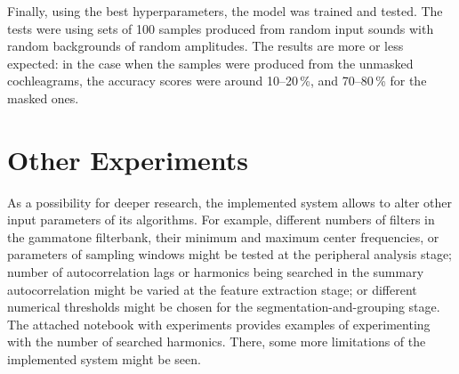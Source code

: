 Finally, using the best hyperparameters, the model was trained and tested. The tests were using sets of 100 samples produced from random input sounds with random backgrounds of random amplitudes. The results are more or less expected: in the case when the samples were produced from the unmasked cochleagrams, the accuracy scores were around 10--20\,\%, and 70--80\,\% for the masked ones.

\section{Other Experiments}

As a possibility for deeper research, the implemented system allows to alter other input parameters of its algorithms. For example, different numbers of filters in the gammatone filterbank, their minimum and maximum center frequencies, or parameters of sampling windows might be tested at the peripheral analysis stage; number of autocorrelation lags or harmonics being searched in the summary autocorrelation might be varied at the feature extraction stage; or different numerical thresholds might be chosen for the segmentation-and-grouping stage. The attached notebook with experiments provides examples of experimenting with the number of searched harmonics. There, some more limitations of the implemented system might be seen.
